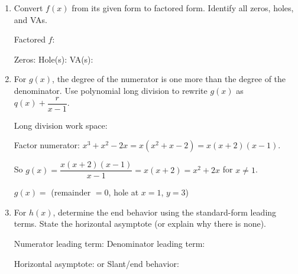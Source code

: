 \documentclass[10pt]{article}
\begin{document}
\vspace{0.1in}

\begin{tcolorbox}[colback=white, colframe=black!40,
    title=\textbf{Tier A --- Apply},
    fonttitle=\bfseries, arc=2mm, left=3mm, right=3mm, top=2mm, bottom=2mm]

\begin{enumerate}[itemsep=10pt]
  \item Convert $f(x)$ from its given form to factored form. Identify all zeros, holes, and VAs.

        \vspace{0.06in}
        Factored $f$: 

        Zeros:  \quad Hole(s):  \quad VA(s): 

  \item For $g(x)$, the degree of the numerator is one more than the degree of the denominator.
        Use polynomial long division to rewrite $g(x)$ as $q(x) + \dfrac{r}{x-1}$.

        \vspace{0.06in}
        Long division work space:

        Factor numerator: $x^3+x^2-2x = x(x^2+x-2) = x(x+2)(x-1)$.

        So $g(x) = \dfrac{x(x+2)(x-1)}{x-1} = x(x+2) = x^2+2x$ for $x\ne 1$.

        \vspace{0.1in}

        $g(x) = $  (remainder $= 0$, hole at $x=1$, $y=3$)

  \item For $h(x)$, determine the end behavior using the standard-form leading terms. State the
        horizontal asymptote (or explain why there is none).

        \vspace{0.06in}
        Numerator leading term:  \quad Denominator leading term: 

        \vspace{0.04in}
        Horizontal asymptote:  \quad or \quad Slant/end behavior: 
\end{enumerate}
\end{tcolorbox}

\vspace{0.1in}
\end{document}
